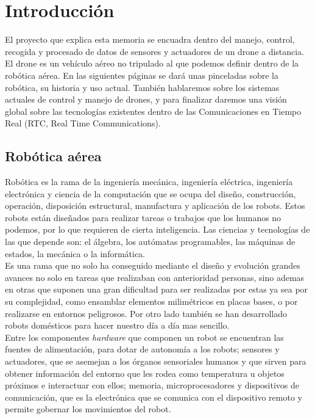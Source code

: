 \chapter{Introducción}

El proyecto que explica esta memoria se encuadra dentro del manejo, control, recogida y procesado de datos de sensores y actuadores de un drone a distancia. El drone es un vehículo aéreo no tripulado al que podemos definir dentro de la robótica aérea. En las siguientes páginas se dará unas pinceladas sobre la robótica, su historia y uso actual. También hablaremos sobre los sistemas actuales de control y manejo de drones, y para finalizar daremos una visión global sobre las tecnologías existentes dentro de las Comunicaciones en Tiempo Real (RTC, Real Time Communications).\\

\section{Robótica aérea}

Robótica es la rama de la ingeniería mecánica, ingeniería eléctrica, ingeniería electrónica y ciencia de la computación que se ocupa del diseño, construcción, operación, disposición estructural, manufactura y aplicación de los robots. Estos robots están diseñados para realizar tareas o trabajos que los humanos no podemos, por lo que requieren de cierta inteligencia. Las ciencias y tecnologías de las que depende son: el álgebra, los autómatas programables, las máquinas de estados, la mecánica o la informática.\\

Es una rama que no solo ha conseguido mediante el diseño y evolución grandes avances no solo en tareas que realizaban con anterioridad personas, sino ademas en otras que suponen una gran dificultad para ser realizadas por estas ya sea por su complejidad, como ensamblar elementos milimétricos en placas bases, o por realizarse en entornos peligrosos. Por otro lado también se han desarrollado robots domésticos para hacer nuestro día a día mas sencillo.\\

Entre los componentes \emph{hardware} que componen un robot se encuentran las fuentes de alimentación, para dotar de autonomía a los robots; sensores y actuadores, que se asemejan a los órganos sensoriales humanos y que sirven para obtener información del entorno que les rodea como temperatura u objetos próximos e interactuar con ellos; memoria, microprocesadores y dispositivos de comunicación, que es la electrónica que se comunica con el dispositivo remoto y permite gobernar los movimientos del robot.\\

